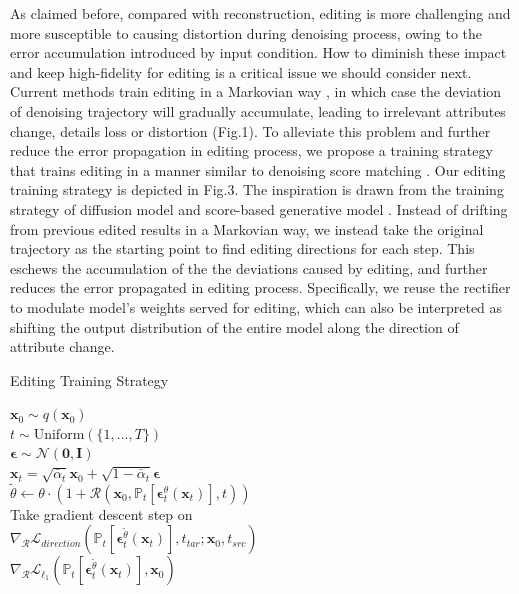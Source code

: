 \documentclass[letterpaper]{article} %
\begin{document}
As claimed before, compared with reconstruction, editing is more challenging and more susceptible to causing distortion during denoising process, owing to the error accumulation introduced by input condition. How to diminish these impact and keep high-fidelity for editing is a critical issue we should consider next. Current methods train editing in a Markovian way \cite{kim2022diffusionclip, kwon2022diffusion}, in which case the deviation of denoising trajectory will gradually accumulate, 
leading to %
irrelevant attributes change, 
details loss or distortion (Fig.1). To alleviate this problem and further reduce the error propagation in editing process, we propose a training strategy that trains editing in a manner similar to denoising score matching \cite{song2020score}. Our editing training strategy is depicted in Fig.3. The inspiration is drawn from the training strategy of
diffusion model \cite{ho2020denoising} and score-based generative model \cite{song2020score}.
Instead of drifting from previous edited results in a Markovian way, 
we instead take %
the original trajectory as the starting point to find editing directions for each step. 
This eschews the accumulation of the %
the deviations caused by editing,
and further reduces the error propagated in editing process. Specifically, we reuse the rectifier to modulate model's weights served for editing, which can also be interpreted as shifting the output distribution of the entire model along the direction of attribute change.

\begin{algorithm}[t]
    \caption{Editing Training Strategy}
    \label{alg:algorithm}
    \begin{algorithmic}[1]
        \REPEAT 
            \STATE $\bm{x}_0 \sim q(\bm{x}_0)$\\
            \STATE $t \sim \mathrm{Uniform}(\{1,...,T\})$\\
            \STATE $\bm{\epsilon} \sim \mathcal{N}(\bm{0},\bm{I})$\\
            \STATE $\bm{x}_t = \sqrt{\bar{\alpha}_t}\bm{x}_0 + \sqrt{1-\bar{\alpha}_t}\bm{\epsilon}$\\
            \STATE $\tilde{\theta} \gets \theta \cdot (1+\bm{\mathcal{R}}(\bm{x}_{0}, \mathbb{P}_t[\bm{\epsilon}_t^\theta(\bm{x}_t)], t))$\\
            \STATE Take gradient descent step on\\
                \qquad $\nabla_{\mathcal{R}} \mathcal{L}_{direction}(\mathbb{P}_t[\bm{\epsilon}_t^{\tilde{\theta}}(\bm{x}_t)], t_{tar};\bm{x}_{0},t_{src})$\\
                \qquad $\nabla_{\mathcal{R}} \mathcal{L}_{\ell_1}(\mathbb{P}_t[\bm{\epsilon}_t^{\tilde{\theta}}(\bm{x}_t)], \bm{x}_0)$
    \end{algorithmic}
\end{algorithm}
\end{document}
